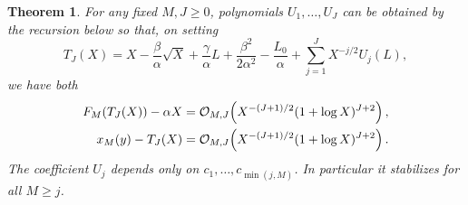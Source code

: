 \documentclass[11pt]{article}
\newtheorem{theorem}{Theorem}[section]
\theoremstyle{remark}\newtheorem{remark}[theorem]{Remark}
\begin{document}
\begin{theorem}\label{bpt:thm:reversion}
For any fixed $M,J\ge0$, polynomials $U_1,\ldots,U_J$ can be obtained by the recursion below so that, on setting
\begin{equation}\label{bpt:eq:TJ}
 T_J(X)=X-\frac\beta\alpha\sqrt X+\frac\gamma\alpha L
        +\frac{\beta^2}{2\alpha^2}-\frac{L_0}\alpha
        +\sum_{j=1}^JX^{-j/2}U_j(L),
\end{equation}
we have both
\begin{align}
 F_M(T_J(X))-\alpha X
     &=\mathcal O_{M,J}\!\left(X^{-(J+1)/2}(1+\log X)^{J+2}\right),\label{bpt:eq:invres}\\
 x_M(y)-T_J(X)
     &=\mathcal O_{M,J}\!\left(X^{-(J+1)/2}(1+\log X)^{J+2}\right).
 \label{bpt:eq:invbound}
\end{align}
The coefficient $U_j$ depends only on $c_1,\ldots,c_{\min(j,M)}$. In particular it stabilizes for all $M\ge j$.
\end{theorem}
\end{document}
